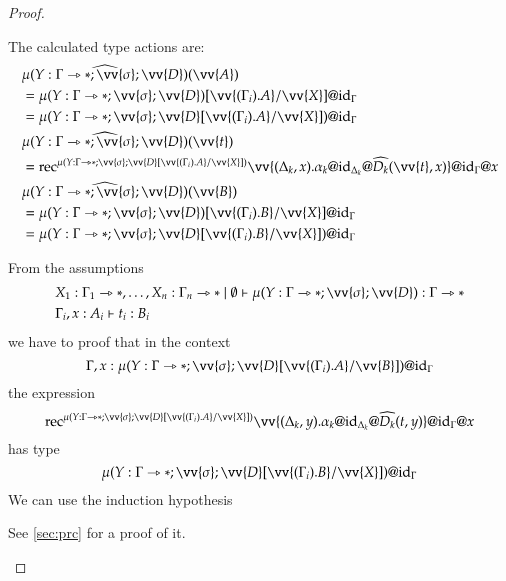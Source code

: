 \documentclass[a4paper,cleardoubleempty,BCOR1cm]{scrbook}
\begin{document}
\begin{proof}
\begin{itemize}
The calculated type actions are:
\begin{align*}
  &\widehat{\mu(Y:\Gamma\rat*;\vv{\sigma};\vv{D})}(\vv{A})\\
  &=\mu(Y:\Gamma\rat*;\vv{\sigma};\vv{D})[\vv{(\Gamma_i).A}/\vv{X}]@\id{\Gamma}\\
  &=\mu(Y:\Gamma\rat*;\vv{\sigma};\vv{D}[\vv{(\Gamma_i).A}/\vv{X}])@\id{\Gamma}\\
  &\widehat{\mu(Y:\Gamma\rat*;\vv{\sigma};\vv{D})}(\vv{t})\\
  &=\text{rec}^{\mu(Y:\Gamma\rat*;\vv{\sigma};\vv{D}[\vv{(\Gamma_i).A}/\vv{X}])}\vv{(\Delta_k,x).\alpha_k@\id{\Delta_k}@\widehat{D_k}(\vv{t},x)}@\id{\Gamma}@x\\
  &\widehat{\mu(Y:\Gamma\rat*;\vv{\sigma};\vv{D})}(\vv{B})\\
  &=\mu(Y:\Gamma\rat*;\vv{\sigma};\vv{D})[\vv{(\Gamma_i).B}/\vv{X}]@\id{\Gamma}\\
  &=\mu(Y:\Gamma\rat*;\vv{\sigma};\vv{D}[\vv{(\Gamma_i).B}/\vv{X}])@\id{\Gamma}
\end{align*}

From the assumptions
\begin{align*}
&X_1:\Gamma_1\rat*,\dots,X_n:\Gamma_n\rat*\mid\emptyset\vdash \mu(Y:\Gamma\rat*;\vv{\sigma};\vv{D}):\Gamma\rat*\\
&\Gamma_i,x:A_i\vdash t_i:B_i
\end{align*}
we have to proof that in the context
\begin{equation*}
 \Gamma,x:\mu(Y:\Gamma\rat*;\vv{\sigma};\vv{D}[\vv{(\Gamma_i).A}/\vv{B}])@\id{\Gamma}
\end{equation*}
the expression
\begin{equation*}
 \text{rec}^{\mu(Y:\Gamma\rat*;\vv{\sigma};\vv{D}[\vv{(\Gamma_i).A}/\vv{X}])}\vv{(\Delta_k,y).\alpha_k@\id{\Delta_k}@\widehat{D_k}(t,y)}@\id{\Gamma}@x
\end{equation*}
has type
\begin{equation*}
\mu(Y:\Gamma\rat*;\vv{\sigma};\vv{D}[\vv{(\Gamma_i).B}/\vv{X}])@\id{\Gamma}
\end{equation*}
We can use the induction hypothesis
\begin{prooftree}
\end{prooftree}
See \ref{sec:prc} for a proof of it.


\end{itemize}
\end{proof}
\end{document}
